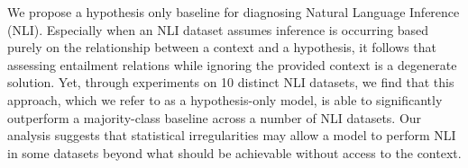 We propose a hypothesis only baseline for diagnosing Natural Language Inference (NLI).  Especially when an NLI dataset assumes inference is occurring based purely on the relationship between a context and a hypothesis, it follows that assessing entailment relations while ignoring the provided context is a degenerate solution.  Yet, through experiments on 10 distinct NLI datasets, we find that this approach, which we refer to as a hypothesis-only model, is able to significantly outperform a majority-class baseline across a number of NLI datasets.  Our analysis suggests that statistical irregularities may allow a model to perform NLI in some datasets beyond what should be achievable without access to the context.
